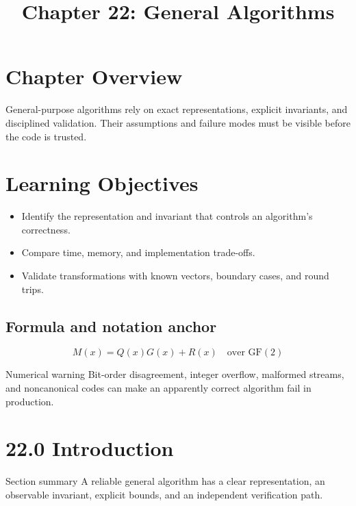 \documentclass[10pt,letterpaper]{article}
\title{Chapter 22: General Algorithms}
\author{}
\date{}
\begin{document}
\maketitle

\section*{Chapter Overview}
General-purpose algorithms rely on exact representations, explicit invariants, and disciplined validation. Their assumptions and failure modes must be visible before the code is trusted.

\section*{Learning Objectives}
\begin{itemize}
\item Identify the representation and invariant that controls an algorithm's correctness.
\item Compare time, memory, and implementation trade-offs.
\item Validate transformations with known vectors, boundary cases, and round trips.
\end{itemize}

\subsection*{Formula and notation anchor}
\[
M(x)=Q(x)G(x)+R(x)\quad\text{over }\mathrm{GF}(2)
\]

\begin{exambox}{Numerical warning}
Bit-order disagreement, integer overflow, malformed streams, and noncanonical codes can make an apparently correct algorithm fail in production.
\end{exambox}

\section{22.0 Introduction}
\begin{cornell}
\end{cornell}

\begin{summarybox}{Section summary}
A reliable general algorithm has a clear representation, an observable invariant, explicit bounds, and an independent verification path.
\end{summarybox}
\end{document}
